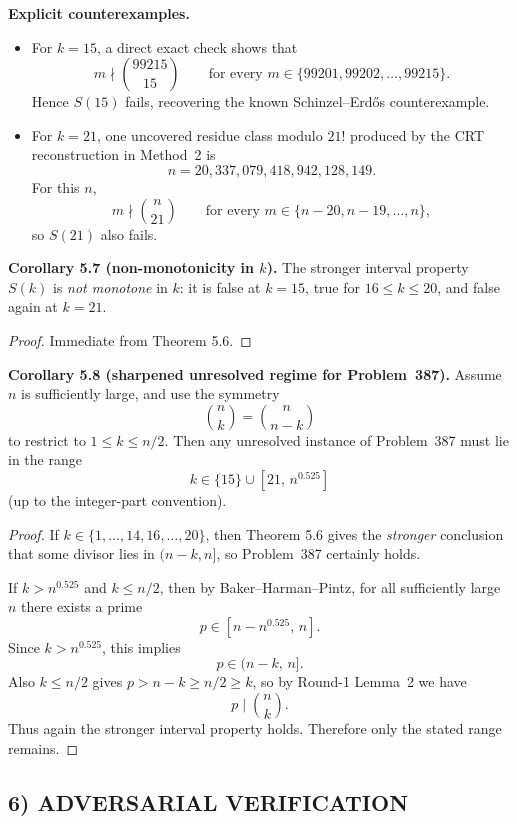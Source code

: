 \medskip
\noindent
\textbf{Explicit counterexamples.}

\begin{itemize}
\item For \(k=15\), a direct exact check shows that
\[
m\nmid \binom{99215}{15}
\qquad\mbox{for every }m\in\{99201,99202,\dots,99215\}.
\]
Hence \(S(15)\) fails, recovering the known Schinzel--Erd\H{o}s counterexample.

\item For \(k=21\), one uncovered residue class modulo \(21!\) produced by the CRT reconstruction in Method~2 is
\[
n=20{,}337{,}079{,}418{,}942{,}128{,}149.
\]
For this \(n\),
\[
m\nmid \binom{n}{21}
\qquad\mbox{for every }m\in\{n-20,n-19,\dots,n\},
\]
so \(S(21)\) also fails.
\end{itemize}

\medskip
\noindent
\textbf{Corollary 5.7 (non-monotonicity in \(k\)).}
The stronger interval property \(S(k)\) is \emph{not monotone} in \(k\): it is false at \(k=15\), true for \(16\le k\le 20\), and false again at \(k=21\).

\begin{proof}
Immediate from Theorem 5.6.
\end{proof}

\medskip
\noindent
\textbf{Corollary 5.8 (sharpened unresolved regime for Problem~387).}
Assume \(n\) is sufficiently large, and use the symmetry
\[
\binom{n}{k}=\binom{n}{n-k}
\]
to restrict to \(1\le k\le n/2\).  Then any unresolved instance of Problem~387 must lie in the range
\[
k\in \{15\}\cup [21,\,n^{0.525}]
\]
(up to the integer-part convention).

\begin{proof}
If \(k\in\{1,\dots,14,16,\dots,20\}\), then Theorem 5.6 gives the \emph{stronger} conclusion that some divisor lies in \((n-k,n]\), so Problem~387 certainly holds.

If \(k>n^{0.525}\) and \(k\le n/2\), then by Baker--Harman--Pintz, for all sufficiently large \(n\) there exists a prime
\[
p\in [n-n^{0.525},\,n].
\]
Since \(k>n^{0.525}\), this implies
\[
p\in (n-k,\,n].
\]
Also \(k\le n/2\) gives \(p>n-k\ge n/2\ge k\), so by Round-1 Lemma~2 we have
\[
p\mid \binom{n}{k}.
\]
Thus again the stronger interval property holds.  Therefore only the stated range remains.
\end{proof}

\subsection*{6) ADVERSARIAL VERIFICATION}


